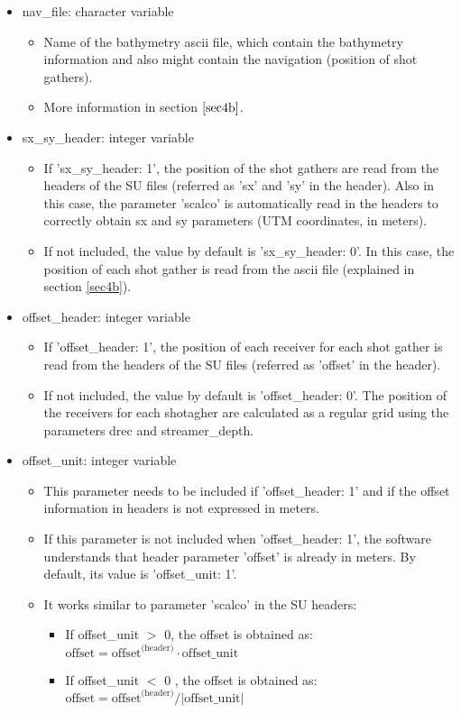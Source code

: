 \documentclass[11pt, oneside]{article}   	%
\begin{document}
\begin{itemize}
\item nav\_{file}: character variable
	\begin{itemize}
	\item Name of the bathymetry ascii file, which contain the bathymetry information and also might contain the navigation (position of shot gathers).
	\item More information in section $\ref{sec4b}$.
	\end{itemize}

\item  sx\_sy\_header: integer variable 
	\begin{itemize}
	\item If 'sx\_sy\_header:  1', the position of the shot gathers are read from the headers of the SU files (referred as 'sx' and 'sy' in the header). Also in this case, the parameter 'scalco' is automatically read in the headers to correctly obtain sx and sy parameters (UTM coordinates, in meters).
	\item If not included, the value by default is 'sx\_sy\_header:  0'. In this case, the position of each shot gather is read from the ascii file (explained in section \ref{sec4b}).
	\end{itemize}

\item  offset\_header: integer variable 
	\begin{itemize}
	\item If 'offset\_header:  1', the position of each receiver for each shot gather is read from the headers of the SU files (referred as 'offset' in the header).
	\item If not included, the value by default is 'offset\_header:  0'. The position of the receivers for each shotagher are calculated as a regular grid using the parameters {drec} and streamer\_depth.
	\end{itemize}

\item  offset\_unit: integer variable
	\begin{itemize}
	\item This parameter needs to be included if 'offset\_header: 1' and if the offset information in headers is not expressed in meters.
	\item If this parameter is not included when 'offset\_header: 1', the software understands that header parameter 'offset' is already in meters. By default, its value is 'offset\_unit: 1'.
	\item It works similar to parameter 'scalco' in the SU headers:
		\begin{itemize}
		\item If offset\_unit $>$ 0, the offset is obtained as:
		$ \text{offset} = \text{offset}^ \text{(header)} \cdot \text{offset\_unit}$
		\item If offset\_unit $<$ 0 , the offset is obtained as:
		$ \text{offset} = \text{offset}^ \text{(header)} / | \text{offset\_unit} |$ 
	\end{itemize}
	

\end{itemize}
\end{itemize}
\end{document}

